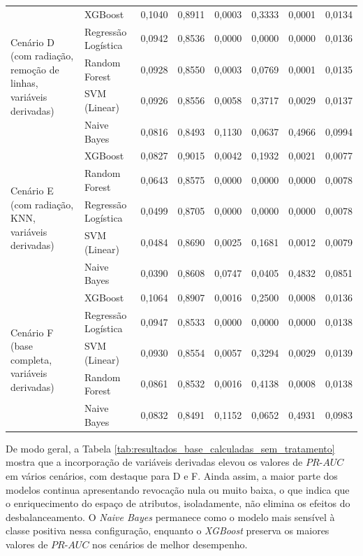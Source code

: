 \begin{longtable}{p{3.4cm} l c c c c c c}
\multirow{5}{*}{\parbox{3.4cm}{\centering Cenário D\\(com radiação, remoção de linhas, variáveis derivadas)}} 
   & XGBoost             & 0,1040 & 0,8911 & 0,0003 & 0,3333 & 0,0001 & 0,0134 \\
   & Regressão Logística & 0,0942 & 0,8536 & 0,0000 & 0,0000 & 0,0000 & 0,0136 \\
   & Random Forest       & 0,0928 & 0,8550 & 0,0003 & 0,0769 & 0,0001 & 0,0135 \\
   & SVM (Linear)        & 0,0926 & 0,8556 & 0,0058 & 0,3717 & 0,0029 & 0,0137 \\
   & Naive Bayes         & 0,0816 & 0,8493 & 0,1130 & 0,0637 & 0,4966 & 0,0994 \\
\midrule

\multirow{5}{*}{\parbox{3.4cm}{\centering Cenário E\\(com radiação, KNN, variáveis derivadas)}} 
   & XGBoost             & 0,0827 & 0,9015 & 0,0042 & 0,1932 & 0,0021 & 0,0077 \\
   & Random Forest       & 0,0643 & 0,8575 & 0,0000 & 0,0000 & 0,0000 & 0,0078 \\
   & Regressão Logística & 0,0499 & 0,8705 & 0,0000 & 0,0000 & 0,0000 & 0,0078 \\
   & SVM (Linear)        & 0,0484 & 0,8690 & 0,0025 & 0,1681 & 0,0012 & 0,0079 \\
   & Naive Bayes         & 0,0390 & 0,8608 & 0,0747 & 0,0405 & 0,4832 & 0,0851 \\
\midrule

\multirow{5}{*}{\parbox{3.4cm}{\centering Cenário F\\(base completa, variáveis derivadas)}} 
   & XGBoost             & 0,1064 & 0,8907 & 0,0016 & 0,2500 & 0,0008 & 0,0136 \\
   & Regressão Logística & 0,0947 & 0,8533 & 0,0000 & 0,0000 & 0,0000 & 0,0138 \\
   & SVM (Linear)        & 0,0930 & 0,8554 & 0,0057 & 0,3294 & 0,0029 & 0,0139 \\
   & Random Forest       & 0,0861 & 0,8532 & 0,0016 & 0,4138 & 0,0008 & 0,0138 \\
   & Naive Bayes         & 0,0832 & 0,8491 & 0,1152 & 0,0652 & 0,4931 & 0,0983 \\
\end{longtable}
\endgroup

De modo geral, a Tabela \ref{tab:resultados_base_calculadas_sem_tratamento} mostra que a incorporação de variáveis derivadas elevou os valores de $PR\text{-}AUC$ em vários cenários, com destaque para D e F. Ainda assim, a maior parte dos modelos continua apresentando revocação nula ou muito baixa, o que indica que o enriquecimento do espaço de atributos, isoladamente, não elimina os efeitos do desbalanceamento. O \textit{Naive Bayes} permanece como o modelo mais sensível à classe positiva nessa configuração, enquanto o \textit{XGBoost} preserva os maiores valores de $PR\text{-}AUC$ nos cenários de melhor desempenho.

